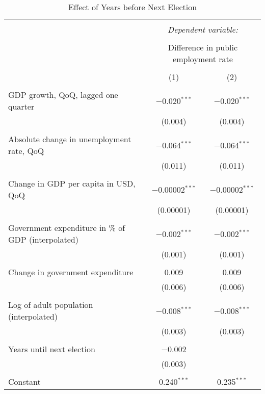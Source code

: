 
\begin{table}[!htbp] \centering 
  \caption{Effect of Years before Next Election} 
  \label{} 
\begin{tabular}{@{\extracolsep{5pt}}lcc} 
\\[-1.8ex]\hline 
\hline \\[-1.8ex] 
 & \multicolumn{2}{c}{\textit{Dependent variable:}} \\ 
\cline{2-3} 
\\[-1.8ex] & \multicolumn{2}{c}{Difference in public employment rate} \\ 
\\[-1.8ex] & (1) & (2)\\ 
\hline \\[-1.8ex] 
 GDP growth, QoQ, lagged one quarter & $-$0.020$^{***}$ & $-$0.020$^{***}$ \\ 
  & (0.004) & (0.004) \\ 
  & & \\ 
 Absolute change in unemployment rate, QoQ & $-$0.064$^{***}$ & $-$0.064$^{***}$ \\ 
  & (0.011) & (0.011) \\ 
  & & \\ 
 Change in GDP per capita in USD, QoQ & $-$0.00002$^{***}$ & $-$0.00002$^{***}$ \\ 
  & (0.00001) & (0.00001) \\ 
  & & \\ 
 Government expenditure in \% of GDP (interpolated) & $-$0.002$^{***}$ & $-$0.002$^{***}$ \\ 
  & (0.001) & (0.001) \\ 
  & & \\ 
 Change in government expenditure & 0.009 & 0.009 \\ 
  & (0.006) & (0.006) \\ 
  & & \\ 
 Log of adult population (interpolated) & $-$0.008$^{***}$ & $-$0.008$^{***}$ \\ 
  & (0.003) & (0.003) \\ 
  & & \\ 
 Years until next election & $-$0.002 &  \\ 
  & (0.003) &  \\ 
  & & \\ 
 Constant & 0.240$^{***}$ & 0.235$^{***}$ \\ 

\end{tabular}
\end{table}
